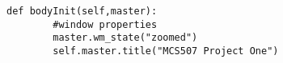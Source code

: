 
\begin{lstlisting}[caption={Example Python Code},label=lst:example,firstnumber=65]
	def bodyInit(self,master):
    	#window properties
    	master.wm_state("zoomed")
    	self.master.title("MCS507 Project One")
\end{lstlisting}